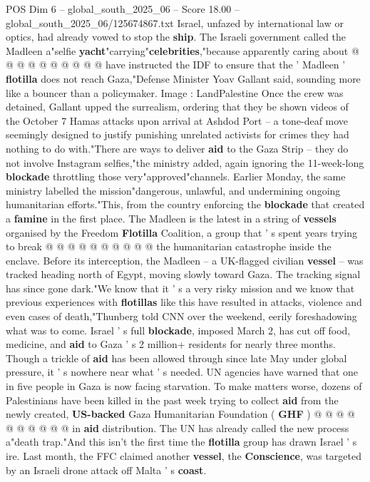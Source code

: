 \begin{textsample}{POS Dim 6 – global\_south\_2025\_06 – Score 18.00 – global\_south\_2025\_06/125674867.txt}
Israel, unfazed by international law or optics, had already vowed to stop the \textbf{ship}.
The Israeli government called the Madleen a"selfie \textbf{yacht}"carrying"\textbf{celebrities},"because apparently caring about @ @ @ @ @ @ @ @ @ @ have instructed the IDF to ensure that the ' Madleen ' \textbf{flotilla} does not reach Gaza,"Defense Minister Yoav Gallant said, sounding more like a bouncer than a policymaker.
Image : LandPalestine Once the crew was detained, Gallant upped the surrealism, ordering that they be shown videos of the October 7 Hamas attacks upon arrival at Ashdod Port -- a tone-deaf move seemingly designed to justify punishing unrelated activists for crimes they had nothing to do with."There are ways to deliver \textbf{aid} to the Gaza Strip -- they do not involve Instagram selfies,"the ministry added, again ignoring the 11-week-long \textbf{blockade} throttling those very"approved"channels.
Earlier Monday, the same ministry labelled the mission"dangerous, unlawful, and undermining ongoing humanitarian efforts."This, from the country enforcing the \textbf{blockade} that created a \textbf{famine} in the first place.
The Madleen is the latest in a string of \textbf{vessels} organised by the Freedom \textbf{Flotilla} Coalition, a group that ' s spent years trying to break @ @ @ @ @ @ @ @ @ @ the humanitarian catastrophe inside the enclave.
Before its interception, the Madleen -- a UK-flagged civilian \textbf{vessel} -- was tracked heading north of Egypt, moving slowly toward Gaza.
The tracking signal has since gone dark."We know that it ' s a very risky mission and we know that previous experiences with \textbf{flotillas} like this have resulted in attacks, violence and even cases of death,"Thunberg told CNN over the weekend, eerily foreshadowing what was to come.
Israel ' s full \textbf{blockade}, imposed March 2, has cut off food, medicine, and \textbf{aid} to Gaza ' s 2 million+ residents for nearly three months.
Though a trickle of \textbf{aid} has been allowed through since late May under global pressure, it ' s nowhere near what ' s needed.
UN agencies have warned that one in five people in Gaza is now facing starvation.
To make matters worse, dozens of Palestinians have been killed in the past week trying to collect \textbf{aid} from the newly created, \textbf{US-backed} Gaza Humanitarian Foundation ( \textbf{GHF} ) @ @ @ @ @ @ @ @ @ @ in \textbf{aid} distribution.
The UN has already called the new process a"death trap."And this isn't the first time the \textbf{flotilla} group has drawn Israel ' s ire.
Last month, the FFC claimed another \textbf{vessel}, the \textbf{Conscience}, was targeted by an Israeli drone attack off Malta ' s \textbf{coast}.

\end{textsample}
